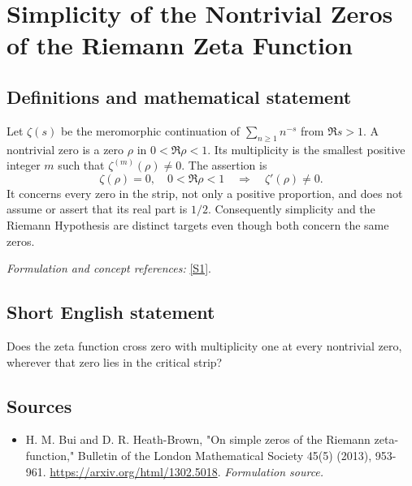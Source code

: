 \documentclass[11pt]{article}
\begin{document}
\section*{\texorpdfstring{Simplicity of the Nontrivial Zeros of the Riemann Zeta Function}{Simplicity of the Nontrivial Zeros of the Riemann Zeta Function}}\label{171}
\subsection{Definitions and mathematical statement}
Let $\zeta(s)$ be the meromorphic continuation of $\sum_{n\ge1}n^{-s}$ from $\Re s>1$. A nontrivial zero is a zero $\rho$ in $0<\Re\rho<1$. Its multiplicity is the smallest positive integer $m$ such that $\zeta^{(m)}(\rho)\ne0$. The assertion is
\[
 \zeta(\rho)=0,\quad0<\Re\rho<1\quad\Longrightarrow\quad\zeta'(\rho)\ne0.
\]
It concerns every zero in the strip, not only a positive proportion, and does not assume or assert that its real part is $1/2$. Consequently simplicity and the Riemann Hypothesis are distinct targets even though both concern the same zeros.
\par\smallskip\textit{Formulation and concept references:} \href{https://arxiv.org/html/1302.5018}{[S1]}.

\subsection{Short English statement}
Does the zeta function cross zero with multiplicity one at every nontrivial zero, wherever that zero lies in the critical strip?
\subsection{Sources}
\begin{itemize}
\item[S1]H. M. Bui and D. R. Heath-Brown, "On simple zeros of the Riemann zeta-function," Bulletin of the London Mathematical Society 45(5) (2013), 953-961.
\url{https://arxiv.org/html/1302.5018}.
\textit{Formulation source.}
\end{itemize}
\end{document}
